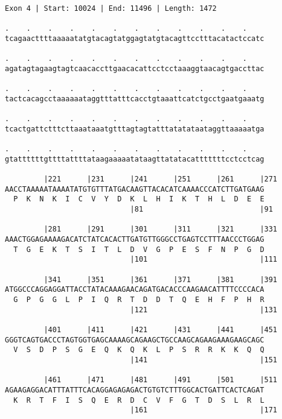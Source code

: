 \documentclass{article}
\begin{document}
\begin{Verbatim}[fontfamily=courier]
Exon 4 | Start: 10024 | End: 11496 | Length: 1472

.    .    .    .    .    .    .    .    .    .    .    .    
tcagaacttttaaaaatatgtacagtatggagtatgtacagttcctttacatactccatc

.    .    .    .    .    .    .    .    .    .    .    .    
agatagtagaagtagtcaacaccttgaacacattcctcctaaaggtaacagtgaccttac

.    .    .    .    .    .    .    .    .    .    .    .    
tactcacagcctaaaaaataggtttatttcacctgtaaattcatctgcctgaatgaaatg

.    .    .    .    .    .    .    .    .    .    .    .    
tcactgattctttcttaaataaatgtttagtagtatttatatataataggttaaaaatga

.    .    .    .    .    .    .    .    .    .    .    .    
gtattttttgttttattttataagaaaaatataagttatatacatttttttcctcctcag

         |221      |231      |241      |251      |261      |271
AACCTAAAAATAAAATATGTGTTTATGACAAGTTACACATCAAAACCCATCTTGATGAAG
  P  K  N  K  I  C  V  Y  D  K  L  H  I  K  T  H  L  D  E  E
                             |81                           |91

         |281      |291      |301      |311      |321      |331
AAACTGGAGAAAAGACATCTATCACACTTGATGTTGGGCCTGAGTCCTTTAACCCTGGAG
  T  G  E  K  T  S  I  T  L  D  V  G  P  E  S  F  N  P  G  D
                             |101                          |111

         |341      |351      |361      |371      |381      |391
ATGGCCCAGGAGGATTACCTATACAAAGAACAGATGACACCCAAGAACATTTTCCCCACA
  G  P  G  G  L  P  I  Q  R  T  D  D  T  Q  E  H  F  P  H  R
                             |121                          |131

         |401      |411      |421      |431      |441      |451
GGGTCAGTGACCCTAGTGGTGAGCAAAAGCAGAAGCTGCCAAGCAGAAGAAAGAAGCAGC
  V  S  D  P  S  G  E  Q  K  Q  K  L  P  S  R  R  K  K  Q  Q
                             |141                          |151

         |461      |471      |481      |491      |501      |511
AGAAGAGGACATTTATTTCACAGGAGAGAGACTGTGTCTTTGGCACTGATTCACTCAGAT
  K  R  T  F  I  S  Q  E  R  D  C  V  F  G  T  D  S  L  R  L
                             |161                          |171

\end{Verbatim}
\newpage
\end{document}
